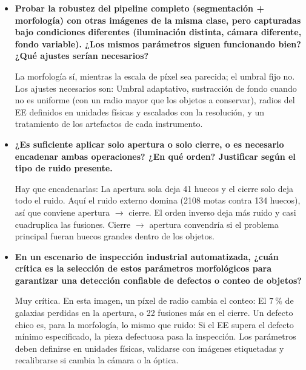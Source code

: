 \begin{itemize}[leftmargin=*]
                Sí. A igual ventana, el cuadrado es mucho más agresivo (en $5 \times 5$ la apertura pierde el $34\ \%$ de las galaxias, cinco veces más que el disco) y la cruz deja contornos dentados. El disco es el adecuado para objetos sin orientación, como las galaxias. La forma es decisiva con estructuras de geometría conocida: Picos de difracción, rayas o fisuras (EE lineales orientados), o piezas rectangulares alineadas con la imagen (cuadrado).

            \item \textbf{Probar la robustez del pipeline completo (segmentación + morfología) con otras imágenes de la misma clase, pero capturadas bajo condiciones diferentes (iluminación distinta, cámara diferente, fondo variable). ¿Los mismos parámetros siguen funcionando bien? ¿Qué ajustes serían necesarios?}

                La morfología sí, mientras la escala de píxel sea parecida; el umbral fijo no. Los ajustes necesarios son: Umbral adaptativo, sustracción de fondo cuando no es uniforme (con un radio mayor que los objetos a conservar), radios del EE definidos en unidades físicas y escalados con la resolución, y un tratamiento de los artefactos de cada instrumento.

            \item \textbf{¿Es suficiente aplicar solo apertura o solo cierre, o es necesario encadenar ambas operaciones? ¿En qué orden? Justificar según el tipo de ruido presente.}

                Hay que encadenarlas: La apertura sola deja 41 huecos y el cierre solo deja todo el ruido. Aquí el ruido externo domina (2108 motas contra 134 huecos), así que conviene apertura $\rightarrow$ cierre. El orden inverso deja más ruido y casi cuadruplica las fusiones. Cierre $\rightarrow$ apertura convendría si el problema principal fueran huecos grandes dentro de los objetos.

            \item \textbf{En un escenario de inspección industrial automatizada, ¿cuán crítica es la selección de estos parámetros morfológicos para garantizar una detección confiable de defectos o conteo de objetos?}

                Muy crítica. En esta imagen, un píxel de radio cambia el conteo: El $7\ \%$ de galaxias perdidas en la apertura, o 22 fusiones más en el cierre. Un defecto chico es, para la morfología, lo mismo que ruido: Si el EE supera el defecto mínimo especificado, la pieza defectuosa pasa la inspección. Los parámetros deben definirse en unidades físicas, validarse con imágenes etiquetadas y recalibrarse si cambia la cámara o la óptica.

        \end{itemize}
